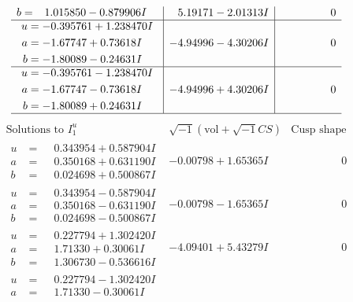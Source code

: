 \documentclass[1p]{elsarticle_modified}
\theoremstyle{definition}
\newcommand{\I}{\sqrt{-1}}
\begin{document}
$$\begin{array}{c|c|c}
\begin{aligned}
b &= \phantom{-}1.015850 - 0.879906 I\end{aligned}
 & \phantom{-}5.19171 - 2.01313 I & \phantom{-0.000000 } 0 \\ \hline\begin{aligned}
u &= -0.395761 + 1.238470 I \\
a &= -1.67747 + 0.73618 I \\
b &= -1.80089 - 0.24631 I\end{aligned}
 & -4.94996 - 4.30206 I & \phantom{-0.000000 } 0 \\ \hline\begin{aligned}
u &= -0.395761 - 1.238470 I \\
a &= -1.67747 - 0.73618 I \\
b &= -1.80089 + 0.24631 I\end{aligned}
 & -4.94996 + 4.30206 I & \phantom{-0.000000 } 0\\
 \hline 
 \end{array}$$\newpage$$\begin{array}{c|c|c}  
\text{Solutions to }I^u_{1}& \I (\text{vol} + \sqrt{-1}CS) & \text{Cusp shape}\\
 \hline 
\begin{aligned}
u &= \phantom{-}0.343954 + 0.587904 I \\
a &= \phantom{-}0.350168 + 0.631190 I \\
b &= \phantom{-}0.024698 + 0.500867 I\end{aligned}
 & -0.00798 + 1.65365 I & \phantom{-0.000000 } 0 \\ \hline\begin{aligned}
u &= \phantom{-}0.343954 - 0.587904 I \\
a &= \phantom{-}0.350168 - 0.631190 I \\
b &= \phantom{-}0.024698 - 0.500867 I\end{aligned}
 & -0.00798 - 1.65365 I & \phantom{-0.000000 } 0 \\ \hline\begin{aligned}
u &= \phantom{-}0.227794 + 1.302420 I \\
a &= \phantom{-}1.71330 + 0.30061 I \\
b &= \phantom{-}1.306730 - 0.536616 I\end{aligned}
 & -4.09401 + 5.43279 I & \phantom{-0.000000 } 0 \\ \hline\begin{aligned}
u &= \phantom{-}0.227794 - 1.302420 I \\
a &= \phantom{-}1.71330 - 0.30061 I \\

\end{aligned}
\end{array}$$
\end{document}
